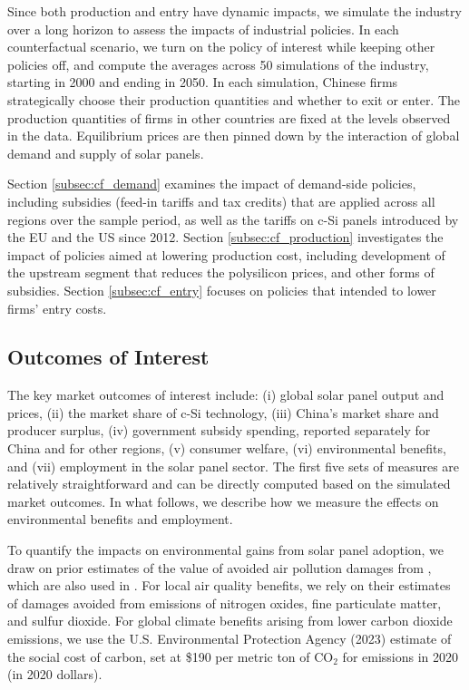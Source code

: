 \documentclass[12pt, letter]{article}
\begin{document}
Since both production and entry have dynamic impacts, we simulate the industry over a long horizon to assess the impacts of industrial policies. In each counterfactual scenario, we turn on the policy of interest while keeping other policies off, and compute the averages across 50 simulations of the industry, starting in 2000 and ending in 2050. In each simulation, Chinese firms strategically choose their production quantities and whether to exit or enter. The production quantities of firms in other countries are fixed at the levels observed in the data. Equilibrium prices are then pinned down by the interaction of global demand and supply of solar panels. 

Section \ref{subsec:cf_demand} examines the impact of demand-side policies, including subsidies (feed-in tariffs and tax credits) that are applied across all regions over the sample period, as well as the tariffs on c-Si panels introduced by the EU and the US since 2012. Section \ref{subsec:cf_production} investigates the impact of policies aimed at lowering production cost, including development of the upstream segment that reduces the polysilicon prices, and other forms of subsidies. Section \ref{subsec:cf_entry} focuses on policies that intended to lower firms' entry costs.

\subsection{Outcomes of Interest}
\label{subsec:cf_outcomes}
The key market outcomes of interest include: (i) global solar panel output and prices, (ii) the market share of c-Si technology, (iii) China's market share and producer surplus, (iv) government subsidy spending, reported separately for China and for other regions, (v) consumer welfare, (vi) environmental benefits, and (vii) employment in the solar panel sector.
The first five sets of measures are relatively straightforward and can be directly computed based on the simulated market outcomes. In what follows, we describe how we measure the effects on environmental benefits and employment.

To quantify the impacts on environmental gains from solar panel adoption, we draw on prior estimates of the value of avoided air pollution damages from \citet{sexton2021heterogeneous}, which are also used in \citet{gerarden2023demanding}. For local air quality benefits, we rely on their estimates of damages avoided from emissions of nitrogen oxides, fine particulate matter, and sulfur dioxide. For global climate benefits arising from lower carbon dioxide emissions, we use the U.S. Environmental Protection Agency (2023) estimate of the social cost of carbon, set at \$190 per metric ton of $\text{CO}_2$ for emissions in 2020 (in 2020 dollars).
\end{document}
